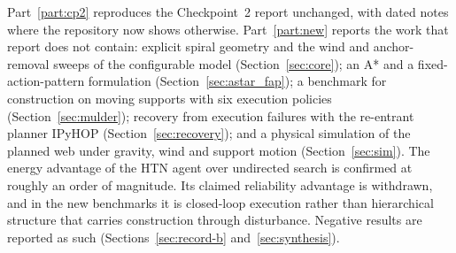 Part~\ref{part:cp2} reproduces the Checkpoint~2 report unchanged, with dated notes where the repository now
shows otherwise. Part~\ref{part:new} reports the work that report does not contain: explicit spiral geometry
and the wind and anchor-removal sweeps of the configurable model (Section~\ref{sec:core}); an A* and a
fixed-action-pattern formulation (Section~\ref{sec:astar_fap}); a benchmark for construction on moving
supports with six execution policies (Section~\ref{sec:mulder}); recovery from execution failures with the
re-entrant planner IPyHOP (Section~\ref{sec:recovery}); and a physical simulation of the planned web under
gravity, wind and support motion (Section~\ref{sec:sim}). The energy advantage of the HTN agent over
undirected search is confirmed at roughly an order of magnitude. Its claimed reliability advantage is
withdrawn, and in the new benchmarks it is closed-loop execution rather than hierarchical structure that
carries construction through disturbance. Negative results are reported as such
(Sections~\ref{sec:record-b} and~\ref{sec:synthesis}).
